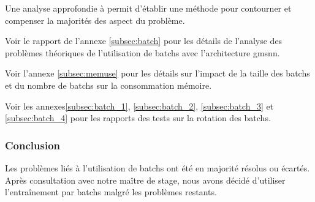 Une analyse approfondie à permit d'établir une méthode pour contourner et compenser la majorités des aspect du problème.

Voir le rapport de l'annexe \ref{subsec:batch} pour les détails de l'analyse des problèmes théoriques de l'utilisation de \glspl{batch} avec l'architecture \gls{gmsnn}.

Voir l'annexe \ref{subsec:memuse} pour les détails sur l'impact de la taille des \glspl{batch} et du nombre de \glspl{batch} sur la consommation mémoire.

Voir les annexes\ref{subsec:batch_1}, \ref{subsec:batch_2}, \ref{subsec:batch_3} et \ref{subsec:batch_4} pour les rapports des tests sur la rotation des \glspl{batch}.

\subsubsection{Conclusion}
Les problèmes liés à l'utilisation de \glspl{batch} ont été en majorité résolus ou écartés. Après consultation avec notre maître de stage, nous avons décidé d'utiliser l'entraînement par \glspl{batch} malgré les problèmes restants.